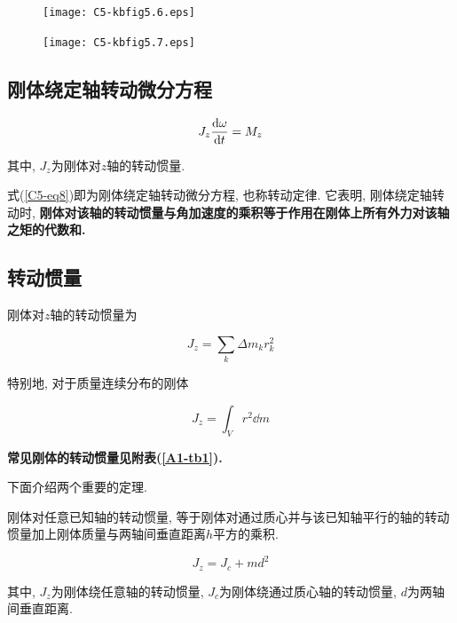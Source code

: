 \begin{figure}[htbp]
	\centering
	\begin{minipage}[t]{0.48\textwidth}
		\centering
		\texttt{[image: C5-kbfig5.6.eps]}
		\label{C5-kbfig5.6}
	\end{minipage}
	\begin{minipage}[t]{0.48\textwidth}
		\centering
		\texttt{[image: C5-kbfig5.7.eps]}
		\label{C5-kbfig5.7}
	\end{minipage}
\end{figure}

\subsection{刚体绕定轴转动微分方程}

\begin{equation}
	J_z \dv{\omega}{t} = M_z \label{C5-eq8}
\end{equation}

其中, $J_z$为刚体对$z$轴的转动惯量. 

式(\ref{C5-eq8})即为刚体绕定轴转动微分方程, 也称转动定律. 它表明, 刚体绕定轴转动时, \textbf{刚体对该轴的转动惯量与角加速度的乘积等于作用在刚体上所有外力对该轴之矩的代数和. }

\subsection{转动惯量} \label{5.2.3}

刚体对$z$轴的转动惯量为

\begin{equation}
	J_z = \sum\limits_{k} \Delta m_k r_k^2 \label{C5-eq9}
\end{equation}

特别地, 对于质量连续分布的刚体

\begin{equation}
	J_z = \int_{V} r^2 \dd{m} \label{C5-eq10}
\end{equation}

\textbf{常见刚体的转动惯量见附表(\ref{A1-tb1}).} 

\vskip 0.3cm

下面介绍两个重要的定理. 

\begin{theorem}[平行轴定理] \label{C5-th1}
	
	刚体对任意已知轴的转动惯量, 等于刚体对通过质心并与该已知轴平行的轴的转动惯量加上刚体质量与两轴间垂直距离$h$平方的乘积. 
	
	\begin{equation}
		J_z = J_c + md^2 \label{C5-eq11}
	\end{equation}
	
	其中, $J_z$为刚体绕任意轴的转动惯量, $J_c$为刚体绕通过质心轴的转动惯量, $d$为两轴间垂直距离. 
	
\end{theorem}

